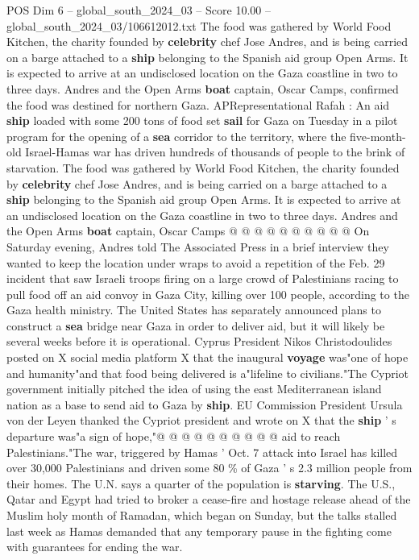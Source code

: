 \begin{textsample}{POS Dim 6 – global\_south\_2024\_03 – Score 10.00 – global\_south\_2024\_03/106612012.txt}  \label{ex:f6_pos_063}
The food was gathered by World Food Kitchen, the charity founded by \textbf{celebrity} chef Jose Andres, and is being carried on a barge attached to a \textbf{ship} belonging to the Spanish aid group Open Arms.
It is expected to arrive at an undisclosed location on the Gaza coastline in two to three days.
Andres and the Open Arms \textbf{boat} captain, Oscar Camps, confirmed the food was destined for northern Gaza.
APRepresentational Rafah : An aid \textbf{ship} loaded with some 200 tons of food set \textbf{sail} for Gaza on Tuesday in a pilot program for the opening of a \textbf{sea} corridor to the territory, where the five-month-old Israel-Hamas war has driven hundreds of thousands of people to the brink of starvation.
The food was gathered by World Food Kitchen, the charity founded by \textbf{celebrity} chef Jose Andres, and is being carried on a barge attached to a \textbf{ship} belonging to the Spanish aid group Open Arms.
It is expected to arrive at an undisclosed location on the Gaza coastline in two to three days.
Andres and the Open Arms \textbf{boat} captain, Oscar Camps @ @ @ @ @ @ @ @ @ @ On Saturday evening, Andres told The Associated Press in a brief interview they wanted to keep the location under wraps to avoid a repetition of the Feb. 29 incident that saw Israeli troops firing on a large crowd of Palestinians racing to pull food off an aid convoy in Gaza City, killing over 100 people, according to the Gaza health ministry.
The United States has separately announced plans to construct a \textbf{sea} bridge near Gaza in order to deliver aid, but it will likely be several weeks before it is operational.
Cyprus President Nikos Christodoulides posted on X social media platform X that the inaugural \textbf{voyage} was"one of hope and humanity"and that food being delivered is a"lifeline to civilians."The Cypriot government initially pitched the idea of using the east Mediterranean island nation as a base to send aid to Gaza by \textbf{ship}.
EU Commission President Ursula von der Leyen thanked the Cypriot president and wrote on X that the \textbf{ship} ' s departure was"a sign of hope,"@ @ @ @ @ @ @ @ @ @ aid to reach Palestinians."The war, triggered by Hamas ' Oct. 7 attack into Israel has killed over 30,000 Palestinians and driven some 80 \% of Gaza ' s 2.3 million people from their homes.
The U.N. says a quarter of the population is \textbf{starving}.
The U.S., Qatar and Egypt had tried to broker a cease-fire and hostage release ahead of the Muslim holy month of Ramadan, which began on Sunday, but the talks stalled last week as Hamas demanded that any temporary pause in the fighting come with guarantees for ending the war.

\end{textsample}
